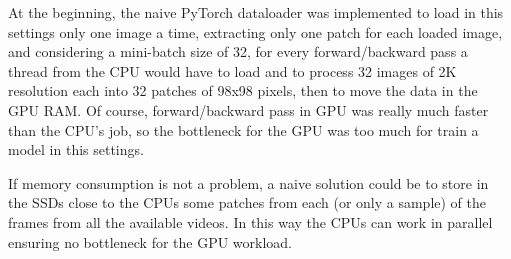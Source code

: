 At the beginning, the naive PyTorch dataloader was implemented to load in this settings only one image a time, extracting only one patch for each loaded image, and considering a mini-batch size of 32, for every forward/backward pass a thread from the CPU would have to load and to process 32 images of 2K resolution each into 32 patches of 98x98 pixels, then to move the data in the GPU RAM. Of course, forward/backward pass in GPU was really much faster than the CPU's job, so the bottleneck for the GPU was too much for train a model in this settings.

If memory consumption is not a problem, a naive solution could be to store in the SSDs close to the CPUs some patches from each (or only a sample) of the frames from all the available videos. In this way the CPUs can work in parallel ensuring no bottleneck for the GPU workload.

